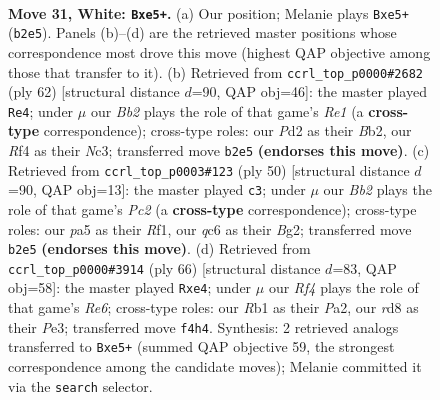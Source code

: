 \documentclass[11pt]{article}
\begin{document}
\clearpage

\begin{figure}[p]\centering
\begin{subfigure}{0.46\textwidth}\centering
\resizebox{\linewidth}{!}{%
\newchessgame
\chessboard[
  setfen={3r1r1k/7n/1pq5/p1p1bp1Q/2P2R2/1P5p/PB1P4/1R4K1 w - - 2 31},
  showmover=false,
  pgfstyle=straightmove, color=movearrow, markmove={b2-e5}
]}
\caption{}
\end{subfigure}\hfill
\begin{subfigure}{0.46\textwidth}\centering
\resizebox{\linewidth}{!}{%
\newchessgame
\chessboard[
  setfen={6kr/ppQ3p1/2p1q2p/4b2P/PP4P1/2N2r2/1BR3K1/4R3 w - - 0 32},
  showmover=false,
  pgfstyle=straightmove, color=movearrow, markmove={e1-e4}
]}
\caption{}
\end{subfigure}
\\[4pt]
\begin{subfigure}{0.46\textwidth}\centering
\resizebox{\linewidth}{!}{%
\newchessgame
\chessboard[
  setfen={r4rk1/1R5p/1Qp3p1/q2pp3/3n4/3P2P1/2P2PBP/5R1K w - - 8 26},
  showmover=false,
  pgfstyle=straightmove, color=movearrow, markmove={c2-c3}
]}
\caption{}
\end{subfigure}\hfill
\begin{subfigure}{0.46\textwidth}\centering
\resizebox{\linewidth}{!}{%
\newchessgame
\chessboard[
  setfen={2r4k/3q1r1p/3BR1pP/p1p5/2Q1p2P/4P3/P4PK1/8 w - - 1 34},
  showmover=false,
  pgfstyle=straightmove, color=movearrow, markmove={e6-e4}
]}
\caption{}
\end{subfigure}
\caption{\textbf{Move 31, White: \texttt{Bxe5+}.} (a) Our position; Melanie plays \texttt{Bxe5+} (\texttt{b2e5}). Panels (b)--(d) are the retrieved master positions whose correspondence most drove this move (highest QAP objective among those that transfer to it). (b) Retrieved from \texttt{ccrl\_top\_p0000\#2682} (ply 62) [structural distance $d$=90, QAP obj=46]: the master played \texttt{Re4}; under $\mu$ our \emph{Bb2} plays the role of that game's \emph{Re1} (a \textbf{cross-type} correspondence); cross-type roles: our \emph{P}d2 as their \emph{B}b2, our \emph{R}f4 as their \emph{N}c3; transferred move \texttt{b2e5} \textbf{(endorses this move)}. (c) Retrieved from \texttt{ccrl\_top\_p0003\#123} (ply 50) [structural distance $d$=90, QAP obj=13]: the master played \texttt{c3}; under $\mu$ our \emph{Bb2} plays the role of that game's \emph{Pc2} (a \textbf{cross-type} correspondence); cross-type roles: our \emph{p}a5 as their \emph{R}f1, our \emph{q}c6 as their \emph{B}g2; transferred move \texttt{b2e5} \textbf{(endorses this move)}. (d) Retrieved from \texttt{ccrl\_top\_p0000\#3914} (ply 66) [structural distance $d$=83, QAP obj=58]: the master played \texttt{Rxe4}; under $\mu$ our \emph{Rf4} plays the role of that game's \emph{Re6}; cross-type roles: our \emph{R}b1 as their \emph{P}a2, our \emph{r}d8 as their \emph{P}e3; transferred move \texttt{f4h4}. Synthesis: 2 retrieved analogs transferred to \texttt{Bxe5+} (summed QAP objective 59, the strongest correspondence among the candidate moves); Melanie committed it via the \texttt{search} selector.}
\label{fig:thought-m60}
\end{figure}
\end{document}
